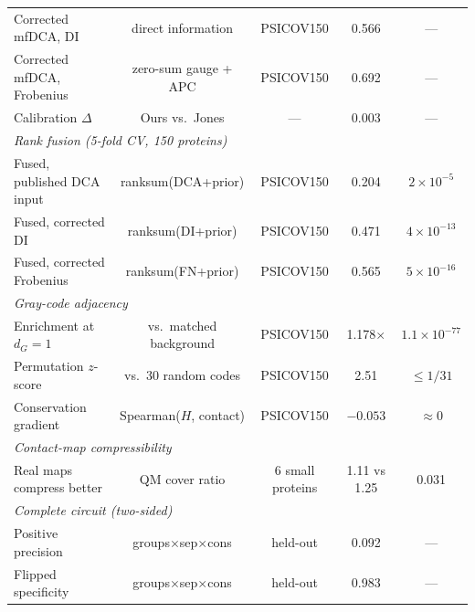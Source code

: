 \begin{table}[ht]
\begin{tabular}{p{2.8cm}cccc}
		Corrected mfDCA, DI           & direct information            & PSICOV150         & 0.566           & ---                   \\
		Corrected mfDCA, Frobenius    & zero-sum gauge + APC          & PSICOV150         & 0.692           & ---                   \\
		Calibration $\Delta$          & Ours vs.\ Jones               & ---               & 0.003           & ---                   \\
		\midrule
		\multicolumn{5}{l}{\textit{Rank fusion (5-fold CV, 150 proteins)}}                                                          \\
		Fused, published DCA input    & ranksum(DCA+prior)            & PSICOV150         & 0.204           & $2{\times}10^{-5}$ \\
		Fused, corrected DI           & ranksum(DI+prior)             & PSICOV150         & 0.471           & $4{\times}10^{-13}$ \\
		Fused, corrected Frobenius    & ranksum(FN+prior)             & PSICOV150         & 0.565           & $5{\times}10^{-16}$ \\
		\midrule
		\multicolumn{5}{l}{\textit{Gray-code adjacency}}                                                                            \\
		Enrichment at $d_G{=}1$       & vs.\ matched background       & PSICOV150         & 1.178$\times$   & $1.1{\times}10^{-77}$ \\
		Permutation $z$-score         & vs.\ 30 random codes          & PSICOV150         & 2.51            & $\leq 1/31$           \\
		Conservation gradient         & Spearman($H$, contact)        & PSICOV150         & $-0.053$        & $\approx 0$           \\
		\midrule
		\multicolumn{5}{l}{\textit{Contact-map compressibility}}                                                                    \\
		Real maps compress better     & QM cover ratio                & 6 small proteins  & 1.11 vs 1.25    & 0.031                 \\
		\midrule
		\multicolumn{5}{l}{\textit{Complete circuit (two-sided)}}                                                                   \\
		Positive precision            & groups$\times$sep$\times$cons & held-out          & 0.092           & ---                   \\
		Flipped specificity           & groups$\times$sep$\times$cons & held-out          & 0.983           & ---                   \\

\end{tabular}
\end{table}

